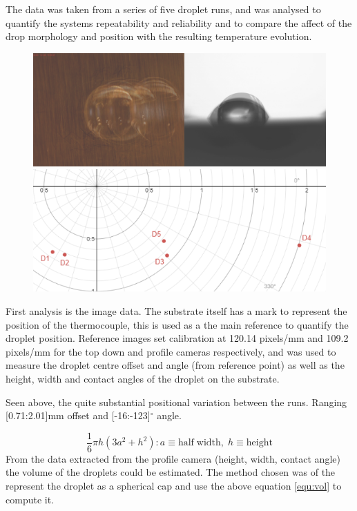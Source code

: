 The data was taken from a series of five droplet runs, and was analysed to quantify the systems repeatability and reliability and to compare the affect of the drop morphology and position with the resulting temperature evolution. 

\begin{figure}[h]
    \begin{center}
        \includegraphics[width=.4\textwidth]{img/droplets_2018.png}
        \includegraphics[width=.4\textwidth]{img/drop_pos_2018.png}
    \end{center}
\end{figure}

First analysis is the image data. The substrate itself has a mark to represent the position of the thermocouple, this is used as a the main reference to quantify the droplet position. Reference images set calibration at 120.14 pixels/mm and 109.2 pixels/mm for the top down and profile cameras respectively, and was used to measure the droplet centre offset and angle (from reference point) as well as the height, width and contact angles of the droplet on the substrate.

Seen above, the quite substantial positional variation between the runs. Ranging [0.71:2.01]mm offset and [-16:-123]$^\circ$ angle. 


\begin{equation}
    \frac{1}{6}\pi h(3a^2 + h^2)
    : a \equiv \mathrm{half \; width}, \; h \equiv \mathrm{height}
    \label{equ:vol}
\end{equation}
From the data extracted from the profile camera (height, width, contact angle) the volume of the droplets could be estimated. The method chosen was of the represent the droplet as a spherical cap and use the above equation \ref{equ:vol} to compute it.

